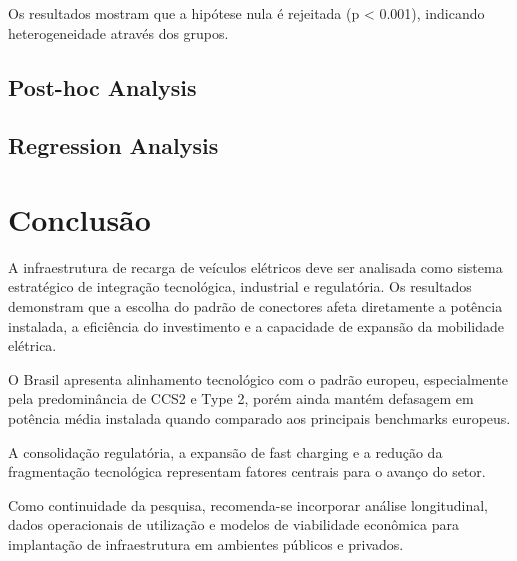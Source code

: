 \documentclass[12pt]{article}
\begin{document}


Os resultados mostram que a hipótese nula é rejeitada (p < 0.001), indicando heterogeneidade através dos grupos.

\subsection{Post-hoc Analysis}
% 

\subsection{Regression Analysis}

\section{Conclusão}
A infraestrutura de recarga de veículos elétricos deve ser analisada como sistema estratégico de integração tecnológica, industrial e regulatória. Os resultados demonstram que a escolha do padrão de conectores afeta diretamente a potência instalada, a eficiência do investimento e a capacidade de expansão da mobilidade elétrica. 

O Brasil apresenta alinhamento tecnológico com o padrão europeu, especialmente pela predominância de CCS2 e Type 2, porém ainda mantém defasagem em potência média instalada quando comparado aos principais benchmarks europeus. 

A consolidação regulatória, a expansão de fast charging e a redução da fragmentação tecnológica representam fatores centrais para o avanço do setor. 

Como continuidade da pesquisa, recomenda-se incorporar análise longitudinal, dados operacionais de utilização e modelos de viabilidade econômica para implantação de infraestrutura em ambientes públicos e privados. 
\end{document}
